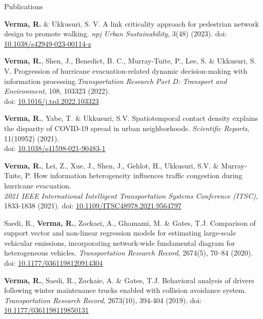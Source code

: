 \documentclass{CV} %
\begin{document}
\begin{rSection}{Publications}
\begin{etaremune}
        \item \textbf{Verma, R.} \& Ukkusuri, S. V. A link criticality approach for pedestrian network design to promote walking. \textit{npj Urban Sustainability}, 3(48) (2023). doi: \href{https://doi.org/10.1038/s42949-023-00114-z}{10.1038/s42949-023-00114-z}
        
        \item \textbf{Verma, R.}, Shen, J., Benedict, B. C., Murray-Tuite, P., Lee, S. \& Ukkusuri, S. V. Progression of hurricane evacuation-related dynamic decision-making with information processing.\textit{Transportation Research Part D: Transport and Environment}, 108, 103323 (2022).\\doi: \href{https://doi.org/10.1016/j.trd.2022.103323}{10.1016/j.trd.2022.103323}
        
        \item \textbf{Verma, R.}, Yabe, T. \& Ukkusuri, S.V. Spatiotemporal contact density explains the disparity of COVID-19 spread in urban neighborhoods. \textit{Scientific Reports}, 11(10952) (2021).
        \\ doi: \href{https://www.nature.com/articles/s41598-021-90483-1}{10.1038/s41598-021-90483-1}
        
        \item \textbf{Verma, R.}, Lei, Z., Xue, J., Shen, J., Gehlot, H., Ukkusuri, S.V. \& Murray-Tuite, P. How information heterogeneity influences traffic congestion during hurricane evacuation.
        \\ \textit{2021 IEEE International Intelligent Transportation Systems Conference (ITSC)}, 1833-1838 (2021). doi: \href{https://ieeexplore.ieee.org/document/9564797}{10.1109/ITSC48978.2021.9564797}

        \item Saedi, R., \textbf{Verma, R.}, Zockaei, A., Ghamami, M. \& Gates, T.J. Comparison of support vector and non-linear regression models for estimating large-scale vehicular emissions, incorporating network-wide fundamental diagram for heterogeneous vehicles. \textit{Transportation Research Record}, 2674(5), 70–84 (2020). doi: \href{https://journals.sagepub.com/doi/abs/10.1177/0361198120914304}{10.1177/0361198120914304}
        
        \item \textbf{Verma, R.}, Saedi, R., Zockaie, A. \& Gates, T.J. Behavioral analysis of drivers following winter maintenance trucks enabled with collision avoidance system. \textit{Transportation Research Record}, 2673(10), 394-404 (2019). doi: \href{https://journals.sagepub.com/doi/abs/10.1177/0361198119850131}{10.1177/0361198119850131}
        

\end{etaremune}
\end{rSection}
\end{document}

